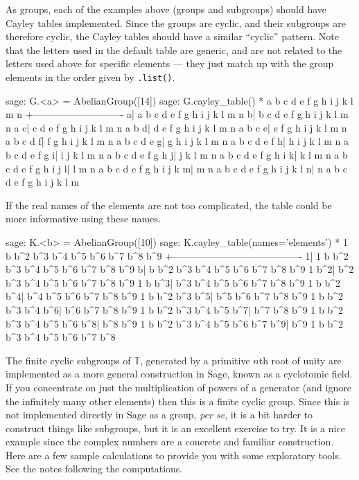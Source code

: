 %
%
As groups, each of the examples above (groups and subgroups) should have Cayley tables implemented.  Since the groups are cyclic, and their subgroups are therefore cyclic, the Cayley tables should have a similar ``cyclic'' pattern.  Note that the letters used in the default table are generic, and are not related to the letters used above for specific elements --- they just match up with the group elements in the order given by \verb?.list()?.
%
\begin{sageexample}
sage: G.<a> = AbelianGroup([14])
sage: G.cayley_table()
*  a b c d e f g h i j k l m n
 +----------------------------
a| a b c d e f g h i j k l m n
b| b c d e f g h i j k l m n a
c| c d e f g h i j k l m n a b
d| d e f g h i j k l m n a b c
e| e f g h i j k l m n a b c d
f| f g h i j k l m n a b c d e
g| g h i j k l m n a b c d e f
h| h i j k l m n a b c d e f g
i| i j k l m n a b c d e f g h
j| j k l m n a b c d e f g h i
k| k l m n a b c d e f g h i j
l| l m n a b c d e f g h i j k
m| m n a b c d e f g h i j k l
n| n a b c d e f g h i j k l m
\end{sageexample}
%
If the real names of the elements are not too complicated, the table could be more informative using these names.
%
\begin{sageexample}
sage: K.<b> = AbelianGroup([10])
sage: K.cayley_table(names='elements')
  *    1   b b^2 b^3 b^4 b^5 b^6 b^7 b^8 b^9
   +----------------------------------------
  1|   1   b b^2 b^3 b^4 b^5 b^6 b^7 b^8 b^9
  b|   b b^2 b^3 b^4 b^5 b^6 b^7 b^8 b^9   1
b^2| b^2 b^3 b^4 b^5 b^6 b^7 b^8 b^9   1   b
b^3| b^3 b^4 b^5 b^6 b^7 b^8 b^9   1   b b^2
b^4| b^4 b^5 b^6 b^7 b^8 b^9   1   b b^2 b^3
b^5| b^5 b^6 b^7 b^8 b^9   1   b b^2 b^3 b^4
b^6| b^6 b^7 b^8 b^9   1   b b^2 b^3 b^4 b^5
b^7| b^7 b^8 b^9   1   b b^2 b^3 b^4 b^5 b^6
b^8| b^8 b^9   1   b b^2 b^3 b^4 b^5 b^6 b^7
b^9| b^9   1   b b^2 b^3 b^4 b^5 b^6 b^7 b^8
\end{sageexample}
%
%
The finite cyclic subgroups of ${\mathbb T}$, generated by a primitive $n$th root of unity are implemented as a more general construction in Sage, known as a cyclotomic field.  If you concentrate on just the multiplication of powers of a generator (and ignore the infinitely many other elements) then this is a finite cyclic group.  Since this is not implemented directly in Sage as a group, {\it per se}, it is a bit harder to construct things like subgroups, but it is an excellent exercise to try.  It is a nice example since the complex numbers are a concrete and familiar construction.  Here are a few sample calculations to provide you with some exploratory tools.  See the notes following the computations.
